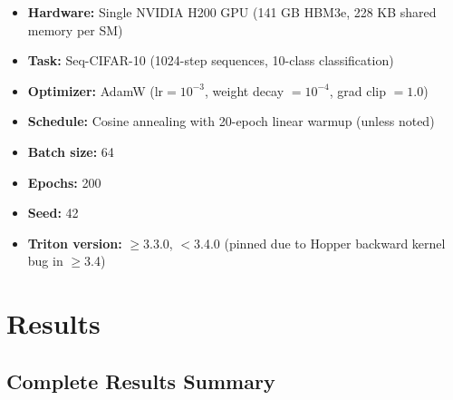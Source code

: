 \documentclass[11pt,a4paper]{article}
\begin{document}
\begin{itemize}
\item \textbf{Hardware:} Single NVIDIA H200 GPU (141 GB HBM3e, 228 KB shared memory per SM)
\item \textbf{Task:} Seq-CIFAR-10 (1024-step sequences, 10-class classification)
\item \textbf{Optimizer:} AdamW ($\text{lr} = 10^{-3}$, weight decay $= 10^{-4}$, grad clip $= 1.0$)
\item \textbf{Schedule:} Cosine annealing with 20-epoch linear warmup (unless noted)
\item \textbf{Batch size:} 64
\item \textbf{Epochs:} 200
\item \textbf{Seed:} 42
\item \textbf{Triton version:} $\ge$3.3.0, $<$3.4.0 (pinned due to Hopper backward kernel bug in $\ge$3.4)
\end{itemize}

\section{Results}

\subsection{Complete Results Summary}
\end{document}
